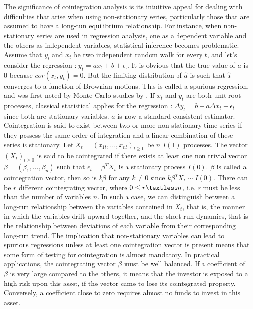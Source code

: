 \documentclass[11pt,a4,twosided,singlespacing,titlepagenumber=on]{scrreprt}
\numberwithin{equation}{chapter} %
\theoremstyle{remark}
\begin{document}
The significance of cointegration analysis is its intuitive appeal for dealing with difficulties that arise when using non-stationary series, particularly those that are assumed to have a long-tun equilibrium relationship. For instance, when non-stationary series are used in regression analysis, one as a dependent variable and the others as independent variables, statistical inference becomes problematic. Assume that $y_t$ and $x_t$ be two independent random walk for every $t$, and let's consider the regression : $y_t = a x_t + b + \epsilon_t$. It is obvious that the true value of $a$ is 0 because $cor(x_t, y_t) = 0$. But the limiting distribution of $\hat{a}$ is such that $\hat{a}$ converges to a function of Brownian motions. This is called a spurious regression, and was first noted by Monte Carlo studies by \cite{granger1974}. If $x_t$ and $y_t$ are both unit root processes, classical statistical applies for the regression : $\Delta y_t = b + a \Delta x_t + \epsilon_t$ since both are stationary variables. $\hat{a}$ is now a standard consistent estimator. \\


Cointegration is said to exist between two or more non-stationary time series if they possess the same order of integration and a linear combination of these series is stationary. Let $X_t = (x_{1t},...,x_{nt})_{t \geq 0}$ be $n$ $I(1)$ processes. The vector $(X_t)_{t \geq 0}$ is said to be cointegrated if there exists at least one non trivial vector $\beta = (\beta_1,...,\beta_n)$ such that $\epsilon_t = \beta^T X_t$ is a stationary process $I(0)$. $\beta$ is called a cointegration vector, then so is $k \beta$ for any $k \neq 0$ since $k\beta^TX_t \sim I(0)$. There can be $r$ different cointegrating vector, where $0 \leq r \textless n$, i.e. $r$ must be less than the number of variables $n$. In such a case, we can distinguish between a long-run relationship between the variables contained in $X_t$, that is, the manner in which the variables drift upward together, and the short-run dynamics, that is the relationship between deviations of each variable from their corresponding long-run trend. The implication that non-stationary variables can lead to spurious regressions unless at least one cointegration vector is present means that some form of testing for cointegration is almost mandatory. In practical applications, the cointegrating vector $\beta$ must be well balanced. If a coefficient of $\beta$ is very large compared to the others, it means that the investor is exposed to a high risk upon this asset, if the vector came to lose its cointegrated property. Conversely, a coefficient close to zero requires almost no funds to invest in this asset.
\end{document}
